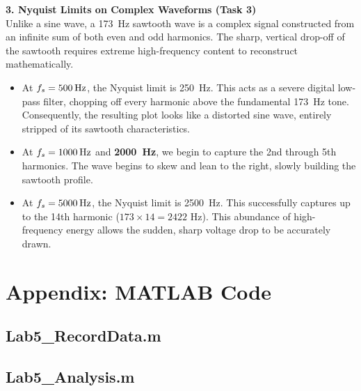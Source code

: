\documentclass[11pt]{article}
\begin{document}
\textbf{3. Nyquist Limits on Complex Waveforms (Task 3)} \\
Unlike a sine wave, a \SI{173}{\hertz} sawtooth wave is a complex signal constructed from an infinite sum of both even and odd harmonics. The sharp, vertical drop-off of the sawtooth requires extreme high-frequency content to reconstruct mathematically.
\begin{itemize}
  \item At $f_s = \textbf{\SI{500}{\hertz}}$, the Nyquist limit is \SI{250}{\hertz}. This acts as a severe digital low-pass filter, chopping off every harmonic above the fundamental \SI{173}{\hertz} tone. Consequently, the resulting plot looks like a distorted sine wave, entirely stripped of its sawtooth characteristics.
  \item At $f_s = \textbf{\SI{1000}{\hertz}}$ and \textbf{\SI{2000}{\hertz}}, we begin to capture the 2nd through 5th harmonics. The wave begins to skew and lean to the right, slowly building the sawtooth profile.
  \item At $f_s = \textbf{\SI{5000}{\hertz}}$, the Nyquist limit is \SI{2500}{\hertz}. This successfully captures up to the 14th harmonic ($173 \times 14 = 2422 \text{ Hz}$). This abundance of high-frequency energy allows the sudden, sharp voltage drop to be accurately drawn.
\end{itemize}

\newpage
\appendix
\section*{Appendix: MATLAB Code}

\subsection*{Lab5\_RecordData.m}


\subsection*{Lab5\_Analysis.m}

\end{document}
